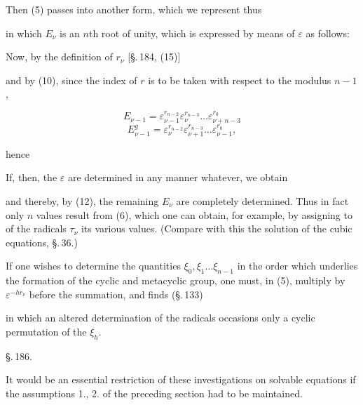 
Then (5) passes into another form, which we represent thus


in which $E_\nu$ is an $n$th root of unity, which is expressed by means of $\varepsilon$ as follows:


Now, by the definition of $r_\nu$ [\S.\,184, (15)]


and by (10), since the index of $r$ is to be taken with respect to the modulus $n-1$,

\[
E_{\nu-1} = \varepsilon_{\nu-1}^{r_{n-2}} \varepsilon_\nu^{r_{n-3}} \ldots \varepsilon_{\nu+n-3}^{r_0}
\]
\[
E_{\nu-1}^g = \varepsilon_\nu^{r_{n-2}} \varepsilon_{\nu+1}^{r_{n-3}} \ldots \varepsilon_{\nu-1}^{r_0},
\]

hence


If, then, the $\varepsilon$ are determined in any manner whatever, we obtain


and thereby, by (12), the remaining $E_\nu$ are completely determined. Thus in fact only $n$ values result from (6), which one can obtain, for example, by assigning to  of the radicals $\tau_\nu$ its various values. (Compare with this the  solution of the cubic equations, \S.\,36.)

If one wishes to determine the quantities $\xi_0, \xi_1 \ldots \xi_{n-1}$ in the order which underlies the formation of the cyclic and metacyclic group, one must, in (5), multiply by $\varepsilon^{-h r_\nu}$ before the summation, and finds (\S.\,133)


in which an altered determination of the radicals occasions only a cyclic permutation of the $\xi_h$.

\begin{center}
\S.\,186.

\end{center}

It would be an essential restriction of these investigations on solvable equations if the assumptions 1., 2. of the preceding section had to be maintained.
